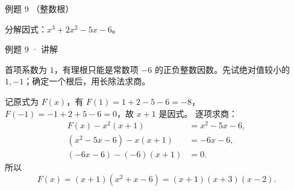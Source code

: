 
\par\noindent\begin{minipage}{\linewidth}

\begin{problem}{例题 9 （整数根）}

分解因式：$x^3+2x^2-5x-6$。

\end{problem}

\begin{solution}[breakable=false]{例题 9 · 讲解}

\think 首项系数为 $1$，有理根只能是常数项 $-6$ 的正负整数因数。先试绝对值较小的 $1,-1$；确定一个根后，用长除法求商。

\solve 记原式为 $F(x)$，有 $F(1)=1+2-5-6=-8$，$F(-1)=-1+2+5-6=0$，故 $x+1$ 是因式。
逐项求商：
\begin{align*}
F(x)-x^2(x+1)&=x^2-5x-6,\\
(x^2-5x-6)-x(x+1)&=-6x-6,\\
(-6x-6)-(-6)(x+1)&=0.
\end{align*}
所以
\[F(x)=(x+1)(x^2+x-6)=(x+1)(x+3)(x-2).\]


\end{solution}

\end{minipage}\par


